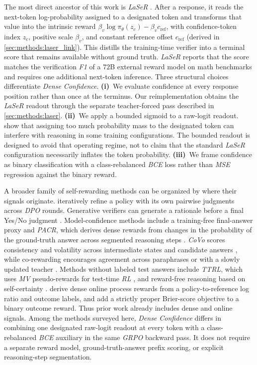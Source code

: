 \documentclass[a4paper,oneside,10pt,english]{scrbook}
\DeclareRobustCommand{\acfit}[1]{\textit{\ac{#1}}}
\begin{document}
The most direct ancestor of this work is \acfit{LaSeR} \citep{laser}. After a response, it reads the next-token log-probability assigned to a designated token and transforms that value into the intrinsic reward $\beta_v \log \pi_\theta(z_c) - \beta_v c_{\mathrm{ref}}$, with confidence-token index $z_c$, positive scale $\beta_v$, and constant reference offset $c_{\mathrm{ref}}$ (derived in \autoref{sec:methods:laser_link}). This distills the training-time verifier into a terminal score that remains available without ground truth. \acfit{LaSeR} reports that the score matches the verification \acfit{F1} of a $72$B external reward model on math benchmarks and requires one additional next-token inference. Three structural choices differentiate \textit{Dense Confidence}. \textbf{(i)}~We evaluate confidence at every response position rather than once at the terminus. Our reimplementation obtains the \acfit{LaSeR} readout through the separate teacher-forced pass described in \autoref{sec:methods:laser}. \textbf{(ii)}~We apply a bounded sigmoid to a raw-logit readout. \citet{laser} show that assigning too much probability mass to the designated token can interfere with reasoning in some training configurations. The bounded readout is designed to avoid that operating regime, not to claim that the standard \acfit{LaSeR} configuration necessarily inflates the token probability. \textbf{(iii)}~We frame confidence as binary classification with a class-rebalanced \acfit{BCE} loss rather than \acfit{MSE} regression against the binary reward.

A broader family of self-rewarding methods can be organized by where their signals originate. \citet{selfrewardingllms} iteratively refine a policy with its own pairwise judgments across \acfit{DPO} rounds. Generative verifiers can generate a rationale before a final Yes/No judgment \citep{genverifiers}. Model-confidence methods include a training-free final-answer proxy \citep{confasreward} and \acfit{PACR}, which derives dense rewards from changes in the probability of the ground-truth answer across segmented reasoning steps \citep{pacr}. \acfit{CoVo} scores consistency and volatility across intermediate states and candidate answers \citep{consistentpaths}, while co-rewarding encourages agreement across paraphrases or with a slowly updated teacher \citep{corewarding}. Methods without labeled test answers include \acfit{TTRL}, which uses \acfit{MV} pseudo-rewards for test-time \acfit{RL} \citep{ttrl}, and reward-free reasoning based on self-certainty \citep{reasonwithoutexternalrewards}. \citet{reinforcementimplicitrewards} derive dense online process rewards from a policy-to-reference log ratio and outcome labels, and \citet{beyondbinaryrewards} add a strictly proper Brier-score objective to a binary outcome reward. Thus prior work already includes dense and online signals. Among the methods surveyed here, \textit{Dense Confidence} differs in combining one designated raw-logit readout at every token with a class-rebalanced \acfit{BCE} auxiliary in the same \acfit{GRPO} backward pass. It does not require a separate reward model, ground-truth-answer prefix scoring, or explicit reasoning-step segmentation.
\end{document}
